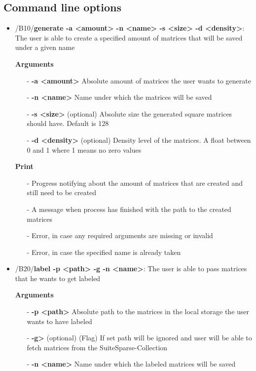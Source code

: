 \documentclass[parskip=full]{scrartcl}
\begin{document}
\subsection{Command line options}
\begin{itemize}
\item/B10/\textbf{generate -a <amount> -n <name> -s <size> -d <density>}:
\newline The user is able to create a specified amount of matrices that will be saved under a given name

\textbf{Arguments}
	\begin{itemize}
	\item[-]\textbf{-a <amount>} Absolute amount of matrices the user wants to generate
	\item[-]\textbf{-n <name>} Name under which the matrices will be saved
	\item[-]\textbf{-s <size>} (optional) Absolute size the generated square matrices should have. Default is 128
	\item[-]\textbf{-d <density>} (optional) Density level of the matrices. A float between 0 and 1 where 1 means no zero values
	\end{itemize}

\textbf{Print}
	\begin{itemize}
	\item[-]Progress notifying about the amount of matrices that are created and still need to be created
	\item[-]A message when process has finished with the path to the created matrices
	\item[-]Error, in case any required arguments are missing or invalid
	\item[-]Error, in case the specified name is already taken
	\end{itemize}

\item/B20/\textbf{label -p <path> -g -n <name>}:
\newline The user is able to pass matrices that he wants to get labeled

\textbf{Arguments}
	\begin{itemize}
	\item[-]\textbf{-p <path>} Absolute path to the matrices in the local storage the user wants to have labeled
	\item[-]\textbf{-g>} (optional) (Flag) If set path will be ignored and user will be able to fetch matrices from the SuiteSparse-Collection
	\item[-]\textbf{-n <name>} Name under which the labeled matrices will be saved
	\end{itemize}


\end{itemize}
\end{document}
